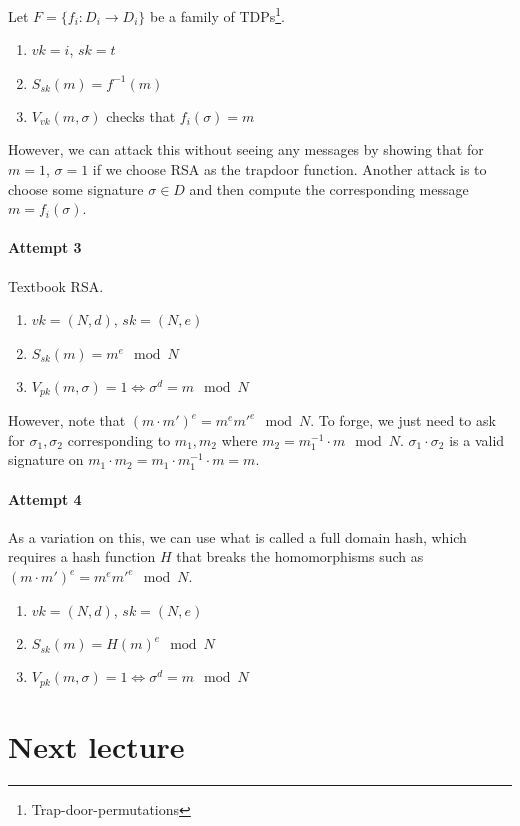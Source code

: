 \documentclass{idc_msc}
\begin{document}
Let \(F = \{f_i : D_i \to D_i\}\) be a family of TDPs\footnote{Trap-door-permutations}.

\begin{enumerate}
  \item \(vk = i\), \(sk = t\)
  \item \(S_{sk}(m) = f^{-1}(m)\)
  \item \(V_{vk}(m, \sigma)\) checks that \(f_i(\sigma) = m\)
\end{enumerate}

However, we can attack this without seeing any messages by showing that for \(m=1\), \(\sigma=1\) if we choose RSA as the trapdoor function.
Another attack is to choose some signature \(\sigma \in D\) and then compute the corresponding message \(m = f_i(\sigma)\).

\paragraph{Attempt 3}

Textbook RSA.

\begin{enumerate}
  \item \(vk = (N, d)\), \(sk = (N, e)\)
  \item \(S_{sk}(m) = m^e \mod N\)
  \item \(V_{pk}(m, \sigma) = 1 \Leftrightarrow \sigma^d = m \mod N\)
\end{enumerate}

However, note that \((m \cdot m')^e = m^e m'^e \mod N\). To forge, we just need to ask for \(\sigma_1, \sigma_2\) corresponding to \(m_1, m_2\) where \(m_2 = m_1^{-1} \cdot m \mod N\).
\(\sigma_1 \cdot \sigma_2\) is a valid signature on \(m_1 \cdot m_2 = m_1 \cdot m_1^{-1} \cdot m = m\).

\paragraph{Attempt 4}

As a variation on this, we can use what is called a full domain hash, which requires a hash function \(H\) that breaks the homomorphisms such as \((m \cdot m')^e = m^e m'^e \mod N\).

\begin{enumerate}
  \item \(vk = (N, d)\), \(sk = (N, e)\)
  \item \(S_{sk}(m) = H(m)^e \mod N\)
  \item \(V_{pk}(m, \sigma) = 1 \Leftrightarrow \sigma^d = m \mod N\)
\end{enumerate}

\section{Next lecture}
\end{document}
